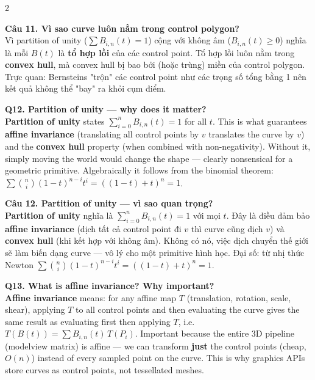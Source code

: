 \begin{paracol}{2}
\switchcolumn

\textbf{Câu 11. Vì sao curve luôn nằm trong control polygon?}\\
Vì partition of unity ($\sum B_{i,n}(t)=1$) cộng với không âm ($B_{i,n}(t)\ge 0$) nghĩa là mỗi $B(t)$ là \textbf{tổ hợp lồi} của các control point. Tổ hợp lồi luôn nằm trong \textbf{convex hull}, mà convex hull bị bao bởi (hoặc trùng) miền của control polygon. Trực quan: Bernsteins "trộn" các control point như các trọng số tổng bằng 1 nên kết quả không thể "bay" ra khỏi cụm điểm.

\switchcolumn*

\textbf{Q12. Partition of unity — why does it matter?}\\
\textbf{Partition of unity} states $\sum_{i=0}^n B_{i,n}(t)=1$ for all $t$. This is what guarantees \textbf{affine invariance} (translating all control points by $v$ translates the curve by $v$) and the \textbf{convex hull} property (when combined with non-negativity). Without it, simply moving the world would change the shape — clearly nonsensical for a geometric primitive. Algebraically it follows from the binomial theorem: $\sum \binom{n}{i}(1-t)^{n-i}t^i=((1-t)+t)^n=1$.

\switchcolumn

\textbf{Câu 12. Partition of unity — vì sao quan trọng?}\\
\textbf{Partition of unity} nghĩa là $\sum_{i=0}^n B_{i,n}(t)=1$ với mọi $t$. Đây là điều đảm bảo \textbf{affine invariance} (dịch tất cả control point đi $v$ thì curve cũng dịch $v$) và \textbf{convex hull} (khi kết hợp với không âm). Không có nó, việc dịch chuyển thế giới sẽ làm biến dạng curve — vô lý cho một primitive hình học. Đại số: từ nhị thức Newton $\sum \binom{n}{i}(1-t)^{n-i}t^i=((1-t)+t)^n=1$.

\switchcolumn*

\textbf{Q13. What is affine invariance? Why important?}\\
\textbf{Affine invariance} means: for any affine map $T$ (translation, rotation, scale, shear), applying $T$ to all control points and then evaluating the curve gives the same result as evaluating first then applying $T$, i.e.\ $T(B(t))=\sum B_{i,n}(t)\, T(P_i)$. Important because the entire 3D pipeline (modelview matrix) is affine — we can transform \textbf{just} the control points (cheap, $O(n)$) instead of every sampled point on the curve. This is why graphics APIs store curves as control points, not tessellated meshes.

\switchcolumn


\end{paracol}
